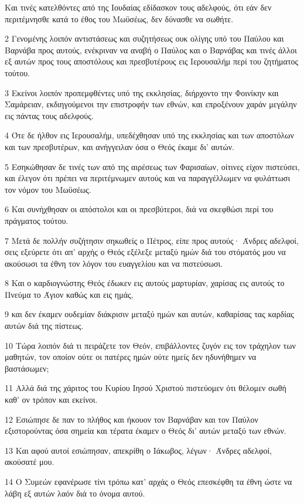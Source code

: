 \par Και τινές κατελθόντες από της Ιουδαίας εδίδασκον τους αδελφούς, ότι εάν δεν περιτέμνησθε κατά το έθος του Μωϋσέως, δεν δύνασθε να σωθήτε.
\par 2 Γενομένης λοιπόν αντιστάσεως και συζητήσεως ουκ ολίγης υπό του Παύλου και Βαρνάβα προς αυτούς, ενέκριναν να αναβή ο Παύλος και ο Βαρνάβας και τινές άλλοι εξ αυτών προς τους αποστόλους και πρεσβυτέρους εις Ιερουσαλήμ περί του ζητήματος τούτου.
\par 3 Εκείνοι λοιπόν προπεμφθέντες υπό της εκκλησίας, διήρχοντο την Φοινίκην και Σαμάρειαν, εκδιηγούμενοι την επιστροφήν των εθνών, και επροξένουν χαράν μεγάλην εις πάντας τους αδελφούς.
\par 4 Ότε δε ήλθον εις Ιερουσαλήμ, υπεδέχθησαν υπό της εκκλησίας και των αποστόλων και των πρεσβυτέρων, και ανήγγειλαν όσα ο Θεός έκαμε δι' αυτών.
\par 5 Εσηκώθησαν δε τινές των από της αιρέσεως των Φαρισαίων, οίτινες είχον πιστεύσει, και έλεγον ότι πρέπει να περιτέμνωμεν αυτούς και να παραγγέλλωμεν να φυλάττωσι τον νόμον του Μωϋσέως.
\par 6 Και συνήχθησαν οι απόστολοι και οι πρεσβύτεροι, διά να σκεφθώσι περί του πράγματος τούτου.
\par 7 Μετά δε πολλήν συζήτησιν σηκωθείς ο Πέτρος, είπε προς αυτούς· Άνδρες αδελφοί, σεις εξεύρετε ότι απ' αρχής ο Θεός εξέλεξε μεταξύ ημών διά του στόματός μου να ακούσωσι τα έθνη τον λόγον του ευαγγελίου και να πιστεύσωσι.
\par 8 Και ο καρδιογνώστης Θεός έδωκεν εις αυτούς μαρτυρίαν, χαρίσας εις αυτούς το Πνεύμα το Άγιον καθώς και εις ημάς,
\par 9 και δεν έκαμεν ουδεμίαν διάκρισιν μεταξύ ημών και αυτών, καθαρίσας τας καρδίας αυτών διά της πίστεως.
\par 10 Τώρα λοιπόν διά τι πειράζετε τον Θεόν, επιβάλλοντες ζυγόν εις τον τράχηλον των μαθητών, τον οποίον ούτε οι πατέρες ημών ούτε ημείς δεν ηδυνήθημεν να βαστάσωμεν;
\par 11 Αλλά διά της χάριτος του Κυρίου Ιησού Χριστού πιστεύομεν ότι θέλομεν σωθή καθ' ον τρόπον και εκείνοι.
\par 12 Εσιώπησε δε παν το πλήθος και ήκουον τον Βαρνάβαν και τον Παύλον εξιστορούντας όσα σημεία και τέρατα έκαμεν ο Θεός δι' αυτών μεταξύ των εθνών.
\par 13 Και αφού αυτοί εσιώπησαν, απεκρίθη ο Ιάκωβος, λέγων· Άνδρες αδελφοί, ακούσατέ μου.
\par 14 Ο Συμεών εφανέρωσε τίνι τρόπω κατ' αρχάς ο Θεός επεσκέφθη τα έθνη ώστε να λάβη εξ αυτών λαόν διά το όνομα αυτού.
